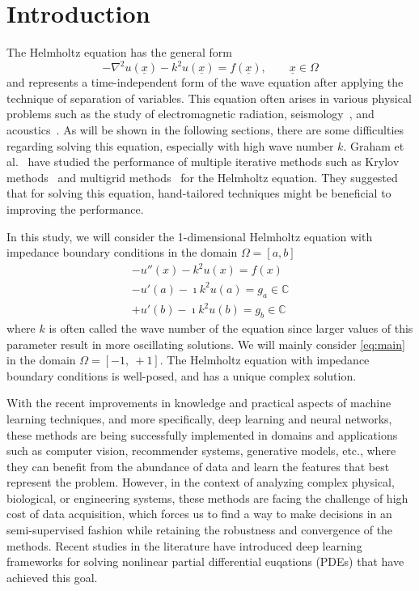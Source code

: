 \section{Introduction}

The Helmholtz equation has the general form
\begin{equation}
    \label{eq:general}
    -\nabla^2{u(\underline{x})} - k^2 u(\underline{x}) = f(\underline{x}), \qquad \underline{x} \in \Omega
\end{equation}
and represents a time-independent form of the wave equation after applying the technique of separation of variables. This equation often arises in various physical problems such as the study of electromagnetic radiation, seismology~\cite{alkhalifah2021}, and acoustics~\cite{sun2015}. As will be shown in the following sections, there are some difficulties regarding solving this equation, especially with high wave number $k$. Graham et al.~\cite{graham2012} have studied the performance of multiple iterative methods such as Krylov methods~\cite{fan2018} and multigrid methods~\cite{xu2016} for the Helmholtz equation. They suggested that for solving this equation, hand-tailored techniques might be beneficial to improving the performance.

In this study, we will consider the 1-dimensional Helmholtz equation with impedance boundary conditions in the domain $\Omega=[a, b]$
\begin{equation}
    \label{eq:main}
    \begin{aligned}
        -u''(x) - k^2 u(x) = f(x)\\
        -u'(a) - \imath k^2 u(a) = g_a \in \mathbb{C}\\
        +u'(b) - \imath k^2 u(b) = g_b \in \mathbb{C}
    \end{aligned}
\end{equation}
where $k$ is often called the wave number of the equation since larger values of this parameter result in more oscillating solutions. We will mainly consider \autoref{eq:main} in the domain $\Omega = [-1,\:+1]$. The Helmholtz equation with impedance boundary conditions is well-posed, and has a unique complex solution.

With the recent improvements in knowledge and practical aspects of machine learning techniques, and more specifically, deep learning and neural networks, these methods are being successfully implemented in domains and applications such as computer vision, recommender systems, generative models, etc., where they can benefit from the abundance of data and learn the features that best represent the problem. However, in the context of analyzing complex physical, biological, or engineering systems, these methods are facing the challenge of high cost of data acquisition, which forces us to find a way to make decisions in an semi-supervised fashion while retaining the robustness and convergence of the methods. Recent studies in the literature have introduced deep learning frameworks for solving nonlinear partial differential
euqations (PDEs) that have achieved this goal.

